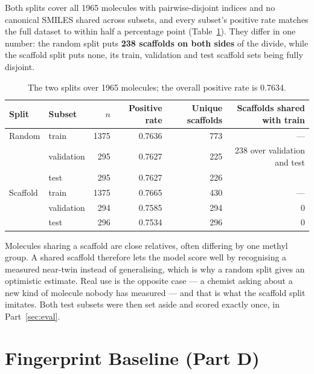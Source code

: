 \documentclass[10pt]{article}
\begin{document}
Both splits cover all 1965 molecules with pairwise-disjoint indices and no canonical SMILES shared across subsets,
and every subset's positive rate matches the full dataset to within half a percentage point
(Table~\ref{tab:splits}). They differ in one number: the random split puts \textbf{238 scaffolds on both sides} of
the divide, while the scaffold split puts none, its train, validation and test scaffold sets being fully disjoint.

\begin{table}[H]
    \centering
    \caption{The two splits over 1965 molecules; the overall positive rate is 0.7634.}
    \label{tab:splits}
    \footnotesize
    \begin{tabular}{llrrrr}
        \toprule
        Split & Subset & $n$ & Positive rate & Unique scaffolds & Scaffolds shared with train \\
        \midrule
        Random   & train      & 1375 & 0.7636 & 773 & --- \\
                 & validation &  295 & 0.7627 & 225 & 238 over validation and test \\
                 & test       &  295 & 0.7627 & 226 &  \\
        \midrule
        Scaffold & train      & 1375 & 0.7665 & 430 & --- \\
                 & validation &  294 & 0.7585 & 294 & 0 \\
                 & test       &  296 & 0.7534 & 296 & 0 \\
        \bottomrule
    \end{tabular}
\end{table}

Molecules sharing a scaffold are close relatives, often differing by one methyl group. A shared scaffold therefore
lets the model score well by recognising a measured near-twin instead of generalising, which is why a random split
gives an optimistic estimate. Real use is the opposite case --- a chemist asking about a new kind of molecule nobody
has measured --- and that is what the scaffold split imitates. Both test subsets were then set aside and scored
exactly once, in Part~\ref{sec:eval}.

\section{Fingerprint Baseline (Part D)}
\label{sec:base}
\end{document}
